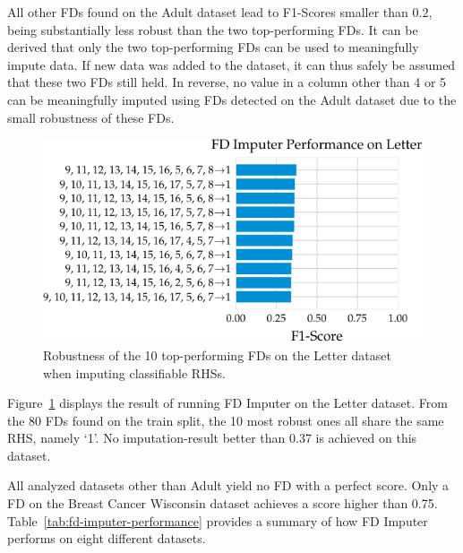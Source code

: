 All other FDs found on the Adult dataset lead to F1-Scores smaller than \( 0.2\), being substantially less robust than the two top-performing FDs.
It can be derived that only the two top-performing FDs can be used to meaningfully impute data.
If new data was added to the dataset, it can thus safely be assumed that these two FDs still held.
In reverse, no value in a column other than 4 or 5 can be meaningfully imputed using FDs detected on the Adult dataset due to the small robustness of these FDs.

\begin{figure}[ht]
     \centering
     \includegraphics[width=.8\textwidth]{../figures/letter/f1_fd_imputer_letter.pdf}
     \caption{Robustness of the 10 top-performing FDs on the Letter dataset when imputing classifiable RHSs.}
     \label{fig:f1_fd_letter}
\end{figure}
Figure~\ref{fig:f1_fd_letter} displays the result of running FD Imputer on the Letter dataset.
From the 80 FDs found on the train split, the 10 most robust ones all share the same RHS, namely `1'.
No imputation-result better than 0.37 is achieved on this dataset.

All analyzed datasets other than Adult yield no FD with a perfect score.
Only a FD on the Breast Cancer Wisconsin dataset achieves a score higher than 0.75.
Table~\ref{tab:fd-imputer-performance} provides a summary of how FD Imputer performs on eight different datasets.

